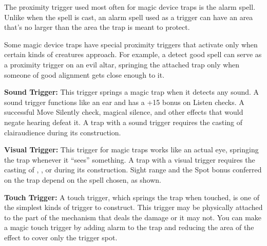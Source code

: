 The proximity trigger used most often for magic device traps is the alarm spell. Unlike when the spell is cast, an alarm spell used as a trigger can have an area that’s no larger than the area the trap is meant to protect.

Some magic device traps have special proximity triggers that activate only when certain kinds of creatures approach. For example, a detect good spell can serve as a proximity trigger on an evil altar, springing the attached trap only when someone of good alignment gets close enough to it.

\textbf{Sound Trigger:} This trigger springs a magic trap when it detects any sound. A sound trigger functions like an ear and has a +15 bonus on Listen checks. A successful Move Silently check, magical silence, and other effects that would negate hearing defeat it. A trap with a sound trigger requires the casting of clairaudience during its construction.

\textbf{Visual Trigger:} This trigger for magic traps works like an actual eye, springing the trap whenever it “sees” something. A trap with a visual trigger requires the casting of , , or  during its construction. Sight range and the Spot bonus conferred on the trap depend on the spell chosen, as shown.


\textbf{Touch Trigger:} A touch trigger, which springs the trap when touched, is one of the simplest kinds of trigger to construct. This trigger may be physically attached to the part of the mechanism that deals the damage or it may not. You can make a magic touch trigger by adding alarm to the trap and reducing the area of the effect to cover only the trigger spot.

